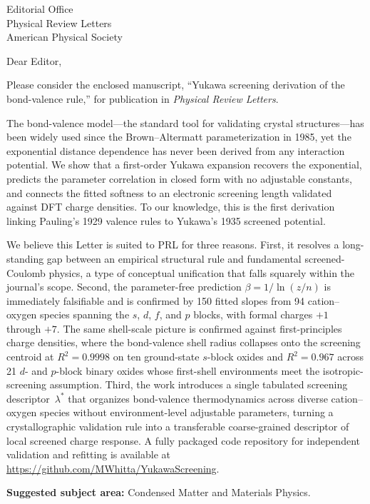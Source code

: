 \documentclass[11pt]{letter}
\begin{document}
\begin{letter}{Editorial Office\\Physical Review Letters\\American Physical Society}

\opening{Dear Editor,}

Please consider the enclosed manuscript, ``Yukawa screening derivation
of the bond-valence rule,'' for publication in \textit{Physical Review
Letters}.

The bond-valence model---the standard tool for validating crystal
structures---has been widely used since the Brown--Altermatt
parameterization in 1985, yet the exponential distance dependence has
never been derived from any interaction potential.  We show that a
first-order Yukawa expansion recovers the exponential, predicts the
parameter correlation in closed form with no adjustable constants, and
connects the fitted softness to an electronic screening length
validated against DFT charge densities.  To our knowledge, this is the
first derivation linking Pauling's 1929 valence rules to Yukawa's 1935
screened potential.

We believe this Letter is suited to PRL for three reasons.  First, it
resolves a long-standing gap between an empirical structural rule and
fundamental screened-Coulomb physics, a type of conceptual unification
that falls squarely within the journal's scope.  Second, the
parameter-free prediction $\beta = 1/\ln(z/n)$ is immediately falsifiable
and is confirmed by 150 fitted slopes from 94 cation--oxygen species
spanning the $s$, $d$, $f$, and $p$ blocks, with formal charges $+1$
through $+7$. The same shell-scale picture is confirmed against
first-principles charge densities, where the bond-valence shell radius
collapses onto the screening centroid at $R^2=0.9998$ on ten
ground-state $s$-block oxides and $R^2=0.967$ across 21 $d$- and
$p$-block binary oxides whose first-shell environments meet the
isotropic-screening assumption.
Third,
the work introduces a single tabulated screening descriptor~$\lambda^*$
that organizes bond-valence thermodynamics across diverse cation--oxygen
species without environment-level adjustable parameters, turning a
crystallographic validation rule into a transferable coarse-grained
descriptor of local screened charge response.  A fully packaged code
repository for independent validation and refitting is available at
\url{https://github.com/MWhitta/YukawaScreening}.

\textbf{Suggested subject area:} Condensed Matter and Materials Physics.


\end{letter}
\end{document}
